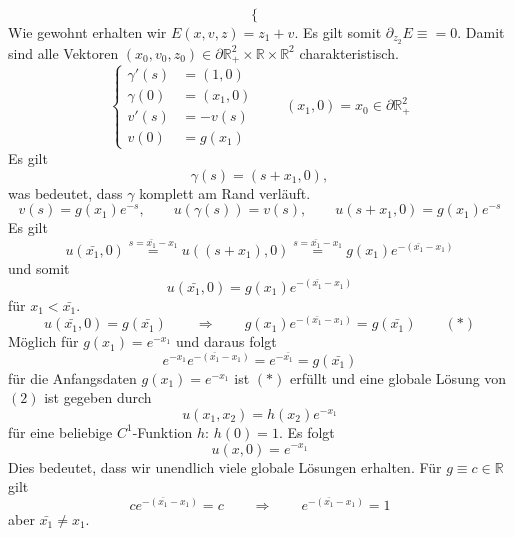 \begin{beispiele}
\begin{enumerate}[1.]
\[\begin{cases}
			\end{cases}
		\]
		Wie gewohnt erhalten wir $E(x,v,z) = z_1 + v$. Es gilt somit $\partial_{z_2}E \equiv = 0$. Damit sind alle Vektoren $(x_0,v_0,z_0) \in \partial \mathbb{R}^2_+ \times \mathbb{R} \times \mathbb{R}^2$ charakteristisch.
		\[
			\begin{cases}
				\gamma'(s) &= (1,0) \\
				\gamma(0) &= (x_1,0) \\
				v'(s) &= -v(s) \\
				v(0) &=g(x_1)
			\end{cases} \qquad (x_1,0)= x_0 \in \partial \mathbb{R}^2_+
		\]
		Es gilt
		\[
			\gamma(s) = (s+ x_1,0),
		\]
		was bedeutet, dass $\gamma$ komplett am Rand verläuft. 
		\[
			v(s) = g(x_1) e^{-s}, \qquad u(\gamma(s)) = v(s), \qquad u(s+x_1,0) = g(x_1) e^{-s}
		\]
		Es gilt
		\[
			u(\bar{x_1},0) \stackrel{s = \bar{x_1}-x_1}{=} u((s+x_1),0) \stackrel{s = \bar{x_1}-x_1}{=} g(x_1)e^{-(\bar{x_1}-x_1)}
		\]
		und somit
		\[
			u(\bar{x_1},0) = g(x_1) e^{-(\bar{x_1}-x_1)} 
		\]
		für $x_1 < \bar{x_1}$. 
		\[
			u(\bar{x_1},0) = g(\bar{x_1}) \qquad \Rightarrow \qquad g(x_1) e^{-(\bar{x_1}-x_1)} = g(\bar{x_1}) \qquad (*)
		\]
		Möglich für $g(x_1) = e^{-x_1}$ und daraus folgt
		\[
			e^{-x_1}e^{-(\bar{x_1}-x_1)} = e^{-\bar{x_1}} = g(\bar{x_1})
		\]
		für die Anfangsdaten $g(x_1) = e^{-x_1}$ ist $(*)$ erfüllt und eine globale Lösung von $(2)$ ist gegeben durch
		\[
			u(x_1,x_2) = h(x_2) e^{-x_1} 
		\]
		für eine beliebige $C^1$-Funktion $h$: $h(0)=1$. Es folgt
		\[
			u(x,0) = e^{-x_1}
		\]
		Dies bedeutet, dass wir unendlich viele globale Lösungen erhalten. Für $g \equiv c \in \mathbb{R}$ gilt	
		\[
			c e^{-(\bar{x_1}-x_1)} = c \qquad \Rightarrow \qquad e^{-(\bar{x_1}-x_1)} =1
		\]
		aber $\bar{x_1} \neq x_1$.
	\end{enumerate}
\end{beispiele}


